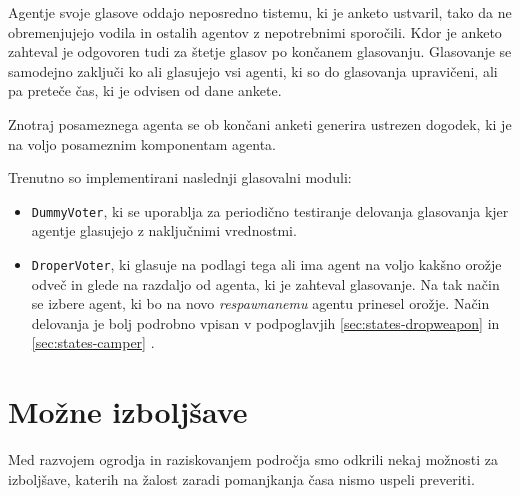 \documentclass[a4paper,10pt]{article}
\begin{document}
Agentje svoje glasove oddajo neposredno tistemu, ki je anketo ustvaril, tako da ne obremenjujejo vodila in ostalih agentov z nepotrebnimi sporočili. Kdor je anketo zahteval je odgovoren tudi za štetje glasov po končanem glasovanju. Glasovanje se samodejno zaključi ko ali glasujejo vsi agenti, ki so do glasovanja upravičeni, ali pa preteče čas, ki je odvisen od dane ankete.

Znotraj posameznega agenta se ob končani anketi generira ustrezen dogodek, ki je na voljo posameznim komponentam agenta.

Trenutno so implementirani naslednji glasovalni moduli:
\begin{itemize}
  \item \texttt{DummyVoter}, ki se uporablja za periodično testiranje delovanja glasovanja kjer agentje glasujejo z naključnimi vrednostmi.
  
  \item \texttt{DroperVoter}, ki glasuje na podlagi tega ali ima agent na voljo kakšno orožje odveč in glede na razdaljo od agenta, ki je zahteval glasovanje. Na tak način se izbere agent, ki bo na novo \textit{respawnanemu} agentu prinesel orožje. Način delovanja je bolj podrobno vpisan v podpoglavjih \ref{sec:states-dropweapon}  in \ref{sec:states-camper} .
\end{itemize} 

\section{Možne izboljšave}

Med razvojem ogrodja in raziskovanjem področja smo odkrili nekaj možnosti za izboljšave, katerih na žalost zaradi pomanjkanja časa nismo uspeli preveriti.
\end{document}
